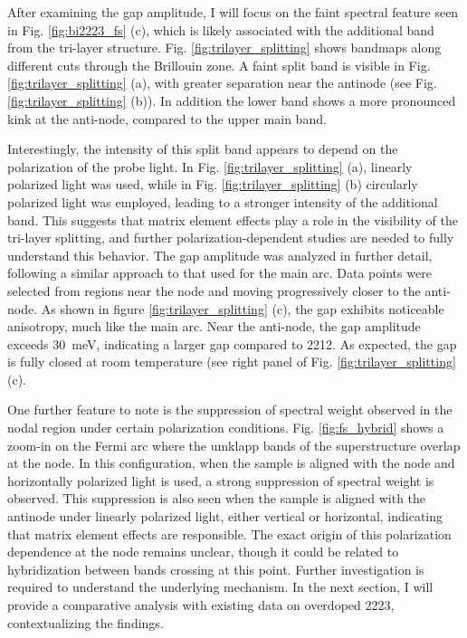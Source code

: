 After examining the gap amplitude, I will focus on the faint spectral feature seen in Fig. \ref{fig:bi2223_fs} (c), which is likely associated with the additional band from the tri-layer structure.
Fig. \ref{fig:trilayer_splitting} shows bandmaps along different cuts through the Brillouin zone.
A faint split band is visible in Fig. \ref{fig:trilayer_splitting} (a), with greater separation near the antinode (see Fig. \ref{fig:trilayer_splitting} (b)).
In addition the lower band shows a more pronounced kink at the anti-node, compared to the upper main band.

Interestingly, the intensity of this split band appears to depend on the polarization of the probe light.
In Fig. \ref{fig:trilayer_splitting} (a), linearly polarized light was used, while in Fig. \ref{fig:trilayer_splitting} (b) circularly polarized light was employed, leading to a stronger intensity of the additional band.
This suggests that matrix element effects play a role in the visibility of the tri-layer splitting, and further polarization-dependent studies are needed to fully understand this behavior.
The gap amplitude was analyzed in further detail, following a similar approach to that used for the main arc.
Data points were selected from regions near the node and moving progressively closer to the anti-node.
As shown in figure \ref{fig:trilayer_splitting} (c), the gap exhibits noticeable anisotropy, much like the main arc.
Near the anti-node, the gap amplitude exceeds \qty{30}{\milli\electronvolt}, indicating a larger gap compared to 2212.
As expected, the gap is fully closed at room temperature (see right panel of Fig. \ref{fig:trilayer_splitting} (c).

One further feature to note is the suppression of spectral weight observed in the nodal region under certain polarization conditions.
Fig. \ref{fig:fs_hybrid} shows a zoom-in on the Fermi arc where the umklapp bands of the superstructure overlap at the node.
In this configuration, when the sample is aligned with the node and horizontally polarized light is used, a strong suppression of spectral weight is observed.
This suppression is also seen when the sample is aligned with the antinode under linearly polarized light, either vertical or horizontal, indicating that matrix element effects are responsible.
The exact origin of this polarization dependence at the node remains unclear, though it could be related to hybridization between bands crossing at this point.
Further investigation is required to understand the underlying mechanism.
In the next section, I will provide a comparative analysis with existing data on overdoped 2223, contextualizing the findings.

